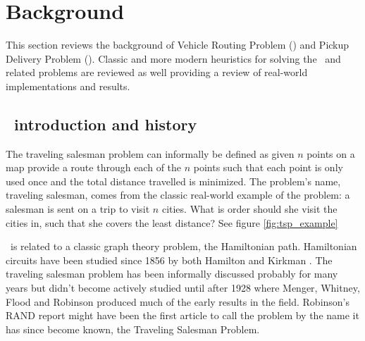 
\chapter{Background}
This section reviews the background of Vehicle Routing Problem (\VRP) and Pickup Delivery Problem (\PDP). Classic and more modern heuristics for solving the \VRP\ and related problems are reviewed as well providing a review of real-world implementations and results. 

\section{\TSP\ introduction and history}
The traveling salesman problem can informally be defined as given $n$ points on a map provide a route through each of the $n$ points such that each point is only used once and the total distance travelled is minimized. The problem's name, traveling salesman, comes from the classic real-world example of the problem: a salesman is sent on a trip to visit $n$ cities. What is order should she visit the cities in, such that she covers the least distance? See figure \ref{fig:tsp_example}


\TSP\ is related to a classic graph theory problem, the Hamiltonian path. Hamiltonian circuits have been studied since 1856 by both Hamilton \cite{Hamilton:1856} and Kirkman \cite{Kirkman:1856}. The traveling salesman problem has been informally discussed probably for many years \cite{Schrijver} but didn't become actively studied until after 1928 where Menger, Whitney, Flood and Robinson produced much of the early results in the field. Robinson's RAND report \cite{Robinson:1949} might have been the first article to call the problem by the name it has since become known, the Traveling Salesman Problem.  


